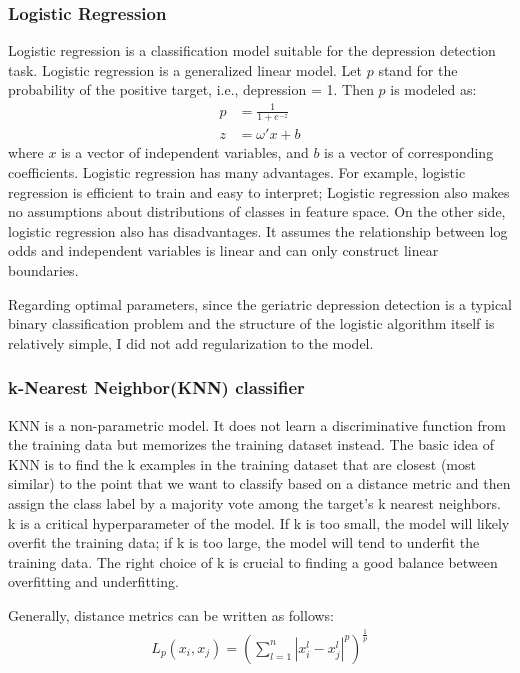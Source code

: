 \documentclass[12pt]{article}
\begin{document}
\subsubsection{Logistic Regression}
\par Logistic regression is a classification model suitable for the depression detection task. Logistic regression is a generalized linear model. Let $p$ stand for the probability of the positive target, i.e., depression = 1. Then $p$ is modeled as:
\begin{align*}
p &= \frac{1}{1+e^{-z}} \label{Logistic_function}\\
z &= \omega'x+b
\end{align*}
where $x$ is a vector of independent variables, and $b$ is a vector of corresponding coefficients. Logistic regression has many advantages. For example, logistic regression is efficient to train and easy to interpret; Logistic regression also makes no assumptions about distributions of classes in feature space. On the other side, logistic regression also has disadvantages. It assumes the relationship between log odds and independent variables is linear and can only construct linear boundaries.

Regarding optimal parameters, since the geriatric depression detection is a typical binary classification problem and the structure of the logistic algorithm itself is relatively simple, I did not add regularization to the model.

\subsubsection{k-Nearest Neighbor(KNN) classifier}
KNN is a non-parametric model. It does not learn a discriminative function from the training data but memorizes the training dataset instead. The basic idea of KNN is to find the k examples in the training dataset that are closest (most similar) to the point that we want to classify based on a distance metric and then assign the class label by a majority vote among the target’s k nearest neighbors. k is a critical hyperparameter of the model. If k is too small, the model will likely overfit the training data; if k is too large, the model will tend to underfit the training data. The right choice of k is crucial to finding a good balance between overfitting and underfitting.

Generally, distance metrics can be written as follows:
\begin{align*}
L_{p}\left(x_{i}, x_{j}\right)=\left(\sum_{l=1}^{n}\left|x_{i}^{l}-x_{j}^{l}\right|^{p}\right)^{\frac{1}{p}}
\end{align*}
\end{document}
